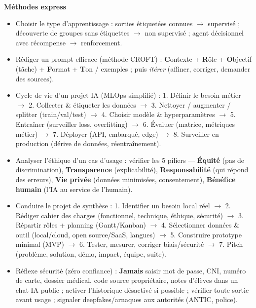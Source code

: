 \documentclass[11pt]{article}
\newcommand{\cle}[1]{{\popxbold\color{popdark}#1}}
\begin{document}
\begin{definition}
\textbf{Méthodes express}
\begin{itemize}
  \item \cle{Choisir le type d'apprentissage} : sorties étiquetées connues $\rightarrow$ supervisé ; découverte de groupes sans étiquettes $\rightarrow$ non supervisé ; agent décisionnel avec récompense $\rightarrow$ renforcement.
  \item \cle{Rédiger un prompt efficace (méthode CROFT)} : \textbf{C}ontexte + \textbf{R}ôle + \textbf{O}bjectif (tâche) + \textbf{F}ormat + \textbf{T}on / exemples ; puis \emph{itérer} (affiner, corriger, demander des sources).
  \item \cle{Cycle de vie d'un projet IA (MLOps simplifié)} : 1. Définir le besoin métier $\rightarrow$ 2. Collecter \& étiqueter les données $\rightarrow$ 3. Nettoyer / augmenter / splitter (train/val/test) $\rightarrow$ 4. Choisir modèle \& hyperparamètres $\rightarrow$ 5. Entraîner (surveiller loss, overfitting) $\rightarrow$ 6. Évaluer (matrice, métriques métier) $\rightarrow$ 7. Déployer (API, embarqué, edge) $\rightarrow$ 8. Surveiller en production (dérive de données, réentraînement).
  \item \cle{Analyser l'éthique d'un cas d'usage} : vérifier les 5 piliers — \textbf{Équité} (pas de discrimination), \textbf{Transparence} (explicabilité), \textbf{Responsabilité} (qui répond des erreurs), \textbf{Vie privée} (données minimisées, consentement), \textbf{Bénéfice humain} (l'IA au service de l'humain).
  \item \cle{Conduire le projet de synthèse} : 1. Identifier un besoin local réel $\rightarrow$ 2. Rédiger cahier des charges (fonctionnel, technique, éthique, sécurité) $\rightarrow$ 3. Répartir rôles + planning (Gantt/Kanban) $\rightarrow$ 4. Sélectionner données \& outil (local/cloud, open source/SaaS, langues) $\rightarrow$ 5. Construire prototype minimal (MVP) $\rightarrow$ 6. Tester, mesurer, corriger biais/sécurité $\rightarrow$ 7. Pitch (problème, solution, démo, impact, équipe, suite).
  \item \cle{Réflexe sécurité (zéro confiance)} : \textbf{Jamais} saisir mot de passe, CNI, numéro de carte, dossier médical, code source propriétaire, notes d'élèves dans un chat IA public ; activer l'historique désactivé si possible ; vérifier toute sortie avant usage ; signaler deepfakes/arnaques aux autorités (ANTIC, police).
\end{itemize}
\end{definition}
\end{document}
